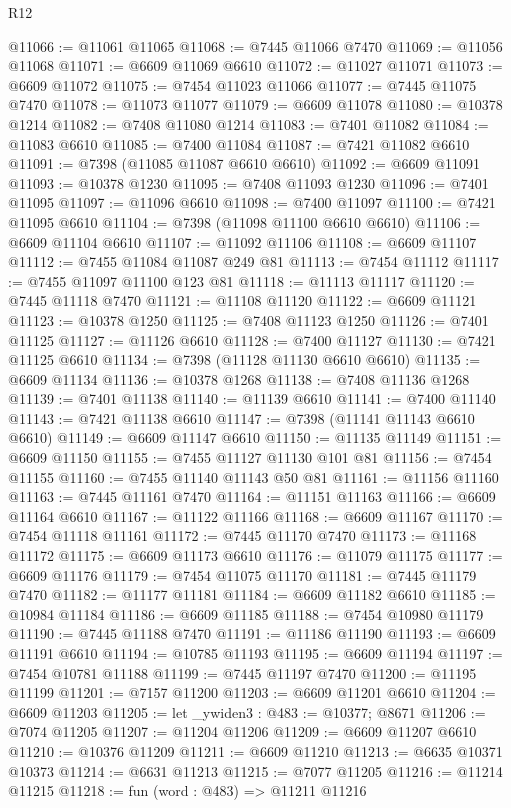 \begin{lexlean}{R12}
\begin{coremodule}
{{{{{{{{{{{{{{{{{{{{{{{{{{{{{{{{{{{{{{{{{{{{{{{{{{{{{{{{{{{{{{{{{{{{{{{{{{{{{{{{{{@11066 := @11061 @11065
@11068 := @7445 @11066 @7470
@11069 := @11056 @11068
@11071 := @6609 @11069 @6610
@11072 := @11027 @11071
@11073 := @6609 @11072
@11075 := @7454 @11023 @11066
@11077 := @7445 @11075 @7470
@11078 := @11073 @11077
@11079 := @6609 @11078
@11080 := @10378 @1214
@11082 := @7408 @11080 @1214
@11083 := @7401 @11082
@11084 := @11083 @6610
@11085 := @7400 @11084
@11087 := @7421 @11082 @6610
@11091 := @7398 (@11085 @11087 @6610 @6610)
@11092 := @6609 @11091
@11093 := @10378 @1230
@11095 := @7408 @11093 @1230
@11096 := @7401 @11095
@11097 := @11096 @6610
@11098 := @7400 @11097
@11100 := @7421 @11095 @6610
@11104 := @7398 (@11098 @11100 @6610 @6610)
@11106 := @6609 @11104 @6610
@11107 := @11092 @11106
@11108 := @6609 @11107
@11112 := @7455 @11084 @11087 @249 @81
@11113 := @7454 @11112
@11117 := @7455 @11097 @11100 @123 @81
@11118 := @11113 @11117
@11120 := @7445 @11118 @7470
@11121 := @11108 @11120
@11122 := @6609 @11121
@11123 := @10378 @1250
@11125 := @7408 @11123 @1250
@11126 := @7401 @11125
@11127 := @11126 @6610
@11128 := @7400 @11127
@11130 := @7421 @11125 @6610
@11134 := @7398 (@11128 @11130 @6610 @6610)
@11135 := @6609 @11134
@11136 := @10378 @1268
@11138 := @7408 @11136 @1268
@11139 := @7401 @11138
@11140 := @11139 @6610
@11141 := @7400 @11140
@11143 := @7421 @11138 @6610
@11147 := @7398 (@11141 @11143 @6610 @6610)
@11149 := @6609 @11147 @6610
@11150 := @11135 @11149
@11151 := @6609 @11150
@11155 := @7455 @11127 @11130 @101 @81
@11156 := @7454 @11155
@11160 := @7455 @11140 @11143 @50 @81
@11161 := @11156 @11160
@11163 := @7445 @11161 @7470
@11164 := @11151 @11163
@11166 := @6609 @11164 @6610
@11167 := @11122 @11166
@11168 := @6609 @11167
@11170 := @7454 @11118 @11161
@11172 := @7445 @11170 @7470
@11173 := @11168 @11172
@11175 := @6609 @11173 @6610
@11176 := @11079 @11175
@11177 := @6609 @11176
@11179 := @7454 @11075 @11170
@11181 := @7445 @11179 @7470
@11182 := @11177 @11181
@11184 := @6609 @11182 @6610
@11185 := @10984 @11184
@11186 := @6609 @11185
@11188 := @7454 @10980 @11179
@11190 := @7445 @11188 @7470
@11191 := @11186 @11190
@11193 := @6609 @11191 @6610
@11194 := @10785 @11193
@11195 := @6609 @11194
@11197 := @7454 @10781 @11188
@11199 := @7445 @11197 @7470
@11200 := @11195 @11199
@11201 := @7157 @11200
@11203 := @6609 @11201 @6610
@11204 := @6609 @11203
@11205 := let _ywiden3 : @483 := @10377; @8671
@11206 := @7074 @11205
@11207 := @11204 @11206
@11209 := @6609 @11207 @6610
@11210 := @10376 @11209
@11211 := @6609 @11210
@11213 := @6635 @10371 @10373
@11214 := @6631 @11213
@11215 := @7077 @11205
@11216 := @11214 @11215
@11218 := fun (word : @483) => @11211 @11216
}}}}}}}}}}}}}}}}}}}}}}}}}}}}}}}}}}}}}}}}}}}}}}}}}}}}}}}}}}}}}}}}}}}}}}}}}}}}}}}}}}
\end{coremodule}
\end{lexlean}
